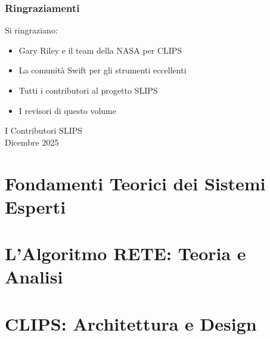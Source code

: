 \documentclass[12pt,a4paper,twoside,openright]{book}
\theoremstyle{definition}
\theoremstyle{remark}
\begin{document}
\section*{Ringraziamenti}

Si ringraziano:
\begin{itemize}
\item Gary Riley e il team della NASA per CLIPS
\item La comunità Swift per gli strumenti eccellenti
\item Tutti i contributori al progetto SLIPS
\item I revisori di questo volume
\end{itemize}

\vspace{1cm}
\begin{flushright}
I Contributori SLIPS\\
Dicembre 2025
\end{flushright}

\tableofcontents
\listoffigures
\listoftables
\lstlistoflistings

\mainmatter

\part{Fondamenti Teorici dei Sistemi Esperti}






\part{L'Algoritmo RETE: Teoria e Analisi}








\part{CLIPS: Architettura e Design}






\end{document}
